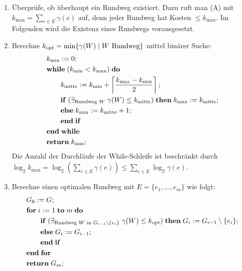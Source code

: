 \begin{Beweis}
    \begin{enumerate}
        \item
        Überprüfe, ob überhaupt ein Rundweg existiert.
        Dazu ruft man (A) mit $k_{\max} = \sum_{e \in E} \gamma(e)$ auf,
        denn jeder Rundweg hat Kosten $\le k_{\max}$.
        Im Folgenden wird die Existenz eines Rundwegs vorausgesetzt.
        
        \item
        Berechne $k_{\text{opt}} = \min\{\gamma(W) \;|\; W \text{ Rundweg}\}$ mittel binärer Suche:
        \begin{align*}&
            k_{\min} := 0;\\&
            \mathbf{while}\; (k_{\min} < k_{\max})\; \mathbf{do}\;\\&
            \qquad k_\text{mitte} := k_{\min} +
            \left\lceil \frac{k_{\max} - k_{\min}}{2} \right\rceil;\\&
            \qquad \mathbf{if}\; (\exists_{\text{Rundweg } W}\; \gamma(W) \le k_\text{mitte})\; \mathbf{then}\;
            k_{\max} := k_\text{mitte};\\&
            \qquad \mathbf{else}\; k_{\min} := k_\text{mitte} + 1;\\&
            \qquad \mathbf{end}\;\mathbf{if}\;\\&
            \mathbf{end}\;\mathbf{while}\;\\&
            \mathbf{return}\; k_{\min};
        \end{align*}
        Die Anzahl der Durchläufe der While-Schleife ist beschränkt durch\\
        $\log_2 k_{\max} = \log_2 (\sum_{e \in E} \gamma(e)) \le \sum_{e \in E} \log_2 \gamma(e)$.
        
        \item
        Berechne einen optimalen Rundweg mit $E = \{e_1, \dotsc, e_m\}$ wie folgt:
        \begin{align*}&
            G_0 := G;\\&
            \mathbf{for}\; i := 1 \;\mathbf{to}\; m \;\mathbf{do}\;\\&
            \qquad \mathbf{if}\; (\exists_{\text{Rundweg } W \text{ in } G_{i-1} \setminus \{e_i\}}\;
            \gamma(W) \le k_{\text{opt}})\; \mathbf{then}\;
            G_i := G_{i-1} \setminus \{e_i\};\\&
            \qquad \mathbf{else}\; G_i := G_{i-1};\\&
            \qquad \mathbf{end}\;\mathbf{if}\;\\&
            \mathbf{end}\;\mathbf{for}\;\\&
            \mathbf{return}\; G_m;
        \end{align*}
    \end{enumerate}
\end{Beweis}

